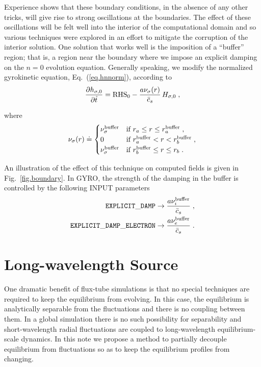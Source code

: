 \noindent
Experience shows that these boundary conditions, in the 
absence of any other tricks, will give rise to strong 
oscillations at the boundaries.  The effect of these 
oscillations will be felt well into the interior of the 
computational domain and so various techniques were 
explored in an effort to mitigate the corruption of the 
interior solution.  One solution that works well is the 
imposition of a ``buffer'' region; that is, a region 
near the boundary where we impose an explicit damping 
on the $n=0$ evolution equation.  Generally speaking, we 
modify the normalized gyrokinetic equation, Eq.~(\ref{eq.hnnorm}),
according to
%
\begin{equation}
\frac{\partial h_{\sigma,0}}{\partial\hat{t}} 
 = \mbox{RHS}_0-\frac{a \nu_\sigma(r)}{\bar{c}_s}\, H_{\sigma,0} \; ,
\end{equation}

\noindent
where
\begin{equation}
\nu_\sigma(r) \doteq
\begin{cases}
\nu_\sigma^{\rm buffer} &
 \text{if $r_a \le r \le r_a^{\rm buffer}$} \; , \\
0 & 
 \text{if $r_a^{\rm buffer} < r < r_b^{\rm buffer}$} \; , \\
\nu_\sigma^{\rm buffer} &
 \text{if $r_b^{\rm buffer} \le r \le r_b$} \; . 
\end{cases}
\end{equation}

\noindent
An illustration of the effect of this technique on 
computed fields is given in Fig.~\ref{fig.boundary}.
In GYRO, the strength of the damping in the buffer is controlled 
by the following INPUT parameters 
%
\begin{align}
{\tt EXPLICIT\_DAMP} 
  \rightarrow \frac{a \nu_i^{\rm buffer}}{\bar{c}_s} \; , \\
{\tt EXPLICIT\_DAMP\_ELECTRON} 
  \rightarrow \frac{a \nu_e^{\rm buffer}}{\bar{c}_s} \; .
\end{align}

\section{Long-wavelength Source}

One dramatic benefit of flux-tube simulations is that no 
special techniques are required to keep the equilibrium from
evolving.  In this case, the equilibrium is analytically 
separable from the fluctuations and there is no coupling 
between them.  In a global simulation there is no such 
possibility for separability and short-wavelength radial
fluctuations are coupled to long-wavelength equilibrium-scale 
dynamics.  In this note we propose a method to partially 
decouple equilibrium from fluctuations so as to keep the 
equilibrium profiles from changing.

